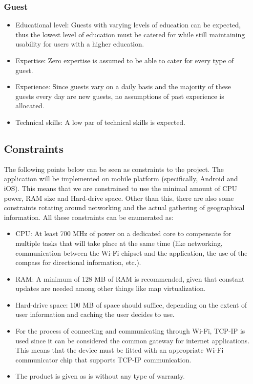 \documentclass[runningheads,a4paper]{article}
\begin{document}
\subsubsection{Guest}

\begin{itemize}
	 
		\item Educational level: Guests with varying levels of education can be expected, thus the lowest level of education must be catered for while still maintaining usability for users with a higher education. 
		\item Expertise: Zero expertise is assumed to be able to cater for every type of guest.
		\item Experience: Since guests vary on a daily basis and the majority of these guests every day are new guests, no assumptions of past experience is allocated.
		\item Technical skills: A low par of technical skills is expected.
	 
\end{itemize}

\subsection{Constraints}
The following points below can be seen as constraints to the project.
The application will be implemented on mobile platform (specifically, Android and iOS). This means that we are constrained to use the minimal amount of CPU power, RAM size and Hard-drive space. Other than this, there are also some constraints rotating around networking and the actual gathering of geographical information. All these constraints can be enumerated as:


\begin{itemize}
	 
		\item CPU: At least 700 MHz of power on a dedicated core to compensate for multiple tasks that will take place at the same time (like networking, communication between the Wi-Fi chipset and the application, the use of the compass for directional information, etc.).
		
		\item RAM: A minimum of 128 MB of RAM is recommended, given that constant updates are needed among other things like map virtualization.
		
		\item Hard-drive space: 100 MB of space should suffice, depending on the extent of user information and caching the user decides to use.
		
		\item For the process of connecting and communicating through Wi-Fi, TCP-IP is used since it can be considered the common gateway for internet applications. This means that the device must be fitted with an appropriate Wi-Fi communicator chip that supports TCP-IP communication.
		
		\item The product is given as is without any type of warranty.
	 
\end{itemize}
 
\end{document}
